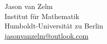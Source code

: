 \documentclass[11pt]{article}
\begin{document}
\vspace{+16 pt}
\noindent Jason van Zelm \\
\noindent Institut f\"{u}r Mathematik \\
\noindent Humboldt-Universit\"{a}t zu Berlin \\
\noindent \href{mailto:jasonvanzelm@outlook.com}{jasonvanzelm@outlook.com}

\end{document}
